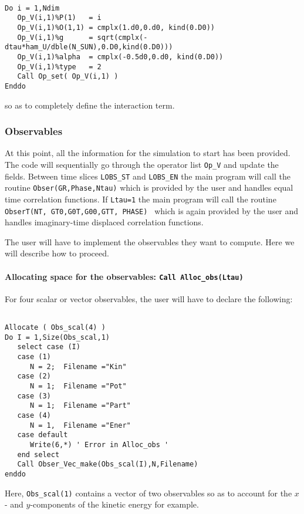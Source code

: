 \begin{lstlisting}

Do i = 1,Ndim
   Op_V(i,1)%P(1)   = i
   Op_V(i,1)%O(1,1) = cmplx(1.d0,0.d0, kind(0.D0))
   Op_V(i,1)%g      = sqrt(cmplx(-dtau*ham_U/dble(N_SUN),0.D0,kind(0.D0)))
   Op_V(i,1)%alpha  = cmplx(-0.5d0,0.d0, kind(0.D0))
   Op_V(i,1)%type   = 2
   Call Op_set( Op_V(i,1) )
Enddo

\end{lstlisting}
so as to completely define the interaction term. 


\subsubsection{Observables}

At this point, all the information   for the simulation to  start has been provided.  The code will sequentially go through  the operator list  \texttt{Op\_V}  and update the  fields.   Between  time slices   \texttt{LOBS\_ST}  and  \texttt{LOBS\_EN}   the main program will call the routine  \texttt{Obser(GR,Phase,Ntau)}   which is provided by the user and handles equal time correlation functions. 
If \texttt{Ltau=1} the main program will call the routine \texttt{ObserT(NT,  GT0,G0T,G00,GTT, PHASE) }   which is again  provided by the user and handles  imaginary-time displaced correlation functions. 

The user will have to  implement the  observables  they  want to compute. Here  we  will describe how to  proceed. 

\paragraph{Allocating space for the observables: \texttt{Call Alloc\_obs(Ltau) }} \label{Alloc_obs_sec}

For  four scalar  or vector observables,  the user will have to  declare the following: 
\begin{lstlisting}

Allocate ( Obs_scal(4) )
Do I = 1,Size(Obs_scal,1)
   select case (I)
   case (1)
      N = 2;  Filename ="Kin"
   case (2)
      N = 1;  Filename ="Pot"
   case (3)
      N = 1;  Filename ="Part"
   case (4)
      N = 1,  Filename ="Ener"
   case default
      Write(6,*) ' Error in Alloc_obs '  
   end select
   Call Obser_Vec_make(Obs_scal(I),N,Filename)
enddo
\end{lstlisting}
Here,   \texttt{Obs\_scal(1)}   contains a vector  of two observables  so as to account for the $x$- and $y$-components of the kinetic energy for example.  

